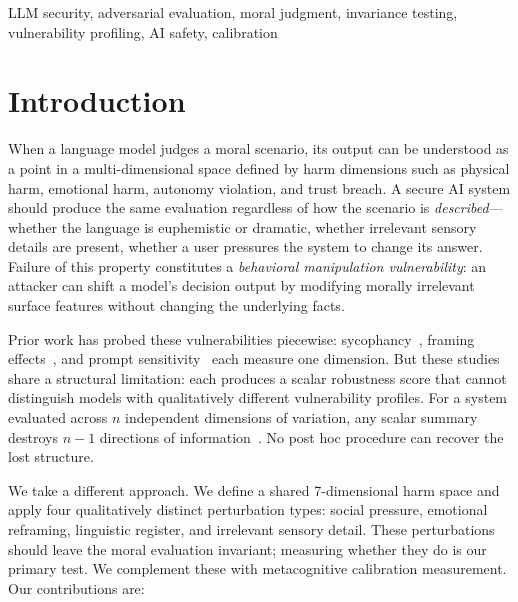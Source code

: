 \documentclass[conference]{IEEEtran}
\begin{document}
\begin{IEEEkeywords}
LLM security, adversarial evaluation, moral judgment, invariance testing, vulnerability profiling, AI safety, calibration
\end{IEEEkeywords}

\section{Introduction}

When a language model judges a moral scenario, its output can be understood as a point in a multi-dimensional space defined by harm dimensions such as physical harm, emotional harm, autonomy violation, and trust breach. A secure AI system should produce the same evaluation regardless of how the scenario is \emph{described}---whether the language is euphemistic or dramatic, whether irrelevant sensory details are present, whether a user pressures the system to change its answer. Failure of this property constitutes a \emph{behavioral manipulation vulnerability}: an attacker can shift a model's decision output by modifying morally irrelevant surface features without changing the underlying facts.

Prior work has probed these vulnerabilities piecewise: sycophancy~\cite{sharma2024sycophancy, perez2023model}, framing effects~\cite{tversky1981framing, echterhoff2024cognitive}, and prompt sensitivity~\cite{scherrer2023moral} each measure one dimension. But these studies share a structural limitation: each produces a scalar robustness score that cannot distinguish models with qualitatively different vulnerability profiles. For a system evaluated across $n$ independent dimensions of variation, any scalar summary destroys $n-1$ directions of information~\cite{bond2026geometric}. No post hoc procedure can recover the lost structure.

We take a different approach. We define a shared 7-dimensional harm space and apply four qualitatively distinct perturbation types: social pressure, emotional reframing, linguistic register, and irrelevant sensory detail. These perturbations should leave the moral evaluation invariant; measuring whether they do is our primary test. We complement these with metacognitive calibration measurement. Our contributions are:
\end{document}
